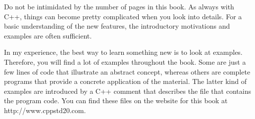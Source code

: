 Do not be intimidated by the number of pages in this book. As always with C++, things can become pretty complicated when you look into details. For a basic understanding of the new features, the introductory motivations and examples are often sufficient.

In my experience, the best way to learn something new is to look at examples. Therefore, you will find a lot of examples throughout the book. Some are just a few lines of code that illustrate an abstract concept, whereas others are complete programs that provide a concrete application of the material. The latter kind of examples are introduced by a C++ comment that describes the file that contains the program code. You can find these files on the website for this book at http://www.cppstd20.com.